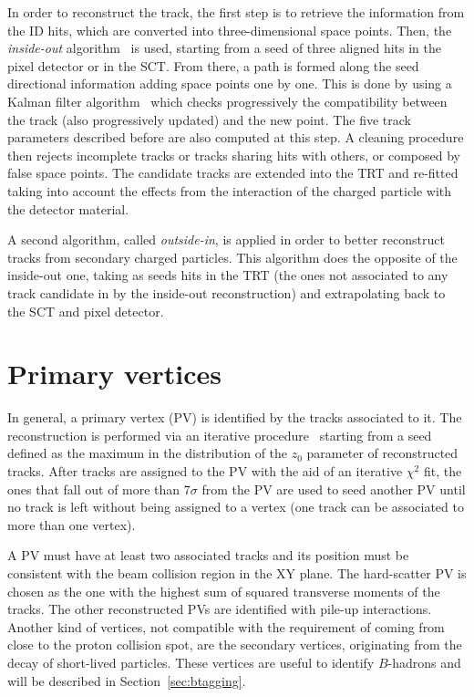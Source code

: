 In order to reconstruct the track, the first step is to retrieve the information from
the ID hits, which are converted into three-dimensional space points. Then, 
the {\it inside-out} algorithm~\cite{Cornelissen:1020106} is used, starting from a
seed of three aligned hits in the pixel detector or in the SCT.
From there, a path is formed along the seed directional information adding
space points one by one. This is done by using a Kalman filter algorithm~\cite{Frühwirth1987444}
which checks progressively the compatibility between the track (also progressively updated)
and the new point. The five track parameters described before are also computed at this step.
A cleaning procedure then 
rejects incomplete tracks or tracks sharing hits with others, or composed by
false space points. The candidate tracks are extended
into the TRT and re-fitted taking into account the effects from the interaction
of the charged particle with the detector material. 

A second algorithm, called {\it outside-in}, is applied in order to better
reconstruct tracks from secondary charged particles. This algorithm does
the opposite of the inside-out one, taking as seeds hits in the TRT (the
ones not associated to any track candidate in by the inside-out reconstruction)
and extrapolating back to the SCT and pixel detector.


\section{Primary vertices}\label{sec:primaryvertex}

In general, a primary vertex (PV) is identified by the tracks associated to it.
The reconstruction is performed via an iterative procedure~\cite{ATLAS-CONF-2010-069}
starting from a seed defined as the maximum in the distribution of the $z_0$ parameter
of reconstructed tracks. After tracks are assigned to the PV with the aid of an
iterative $\chi^2$ fit, the ones that fall out of more than 7$\sigma$ from the PV
are used to seed another PV until no track is left without being assigned to a vertex
(one track can be associated to more than one vertex).

A PV must have at least two associated tracks and its position must be consistent with 
the beam collision region in the XY plane. The hard-scatter PV is chosen as the one
with the highest sum of squared transverse moments of the tracks. The other reconstructed PVs 
are identified with pile-up interactions. Another kind of vertices, not
compatible with the requirement of coming from close to the proton collision spot,
are the secondary vertices, originating from the decay of short-lived particles.
These vertices are useful to identify $B$-hadrons and will be described in Section~\ref{sec:btagging}.

